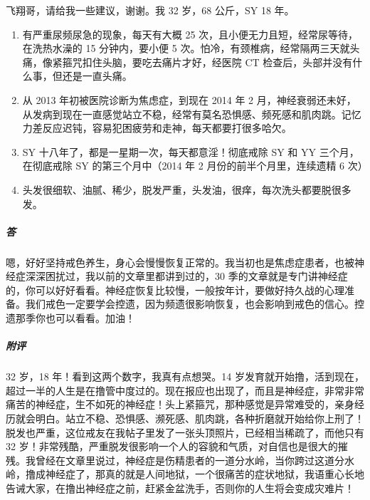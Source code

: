 \begin{case}
    飞翔哥，请给我一些建议，谢谢。我 32 岁，68 公斤，SY 18 年。\begin{enumerate}
        \item 有严重尿频尿急的现象，每天有大概 25 次，且小便无力且短，经常尿等待，在洗热水澡的 15 分钟内，要小便 5 次。怕冷，有颈椎病，经常隔两三天就头痛，像紧箍咒扣住头脑，要吃去痛片才好，经医院 CT 检查后，头部并没有什么事，但还是一直头痛。
        \item 从 2013 年初被医院诊断为焦虑症，到现在 2014 年 2 月，神经衰弱还未好，从发病到现在一直感觉站立不稳，经常有莫名恐惧感、频死感和肌肉跳。记忆力差反应迟钝，容易犯困疲劳和走神，每天都要打很多哈欠。
        \item SY 十八年了，都是一星期一次，每天都意淫！彻底戒除 SY 和 YY 三个月，在彻底戒除 SY 的第三个月中（2014 年 2 月份的前半个月里，连续遗精 6 次）
        \item 头发很细软、油腻、稀少，脱发严重，头发油，很痒，每次洗头都要脱很多发。
    \end{enumerate}
    \subparagraph{答} 嗯，好好坚持戒色养生，身心会慢慢恢复正常的。我当初也是焦虑症患者，也被神经症深深困扰过，我以前的文章里都讲到过的，30 季的文章就是专门讲神经症的，你可以好好看看。神经症恢复比较慢，一般按年计，要做好持久战的心理准备。我们戒色一定要学会控遗，因为频遗很影响恢复，也会影响到戒色的信心。控遗那季你也可以看看。加油！
    \subparagraph{附评} 32 岁，18 年！看到这两个数字，我真有点想哭。14 岁发育就开始撸，活到现在，超过一半的人生是在撸管中度过的。现在报应也出现了，而且是神经症，非常非常痛苦的神经症，生不如死的神经症！头上紧箍咒，那种感觉是异常难受的，亲身经历就会明白。站立不稳、恐惧感、濒死感、肌肉跳，各种折磨就开始给你上刑了！脱发也严重，这位戒友在我帖子里发了一张头顶照片，已经相当稀疏了，而他只有 32 岁！非常残酷，严重脱发很影响一个人的容貌和气质，对自信也是很大的摧残。我曾经在文章里说过，神经症是伤精患者的一道分水岭，当你跨过这道分水岭，撸成神经症了，那真的就是人间地狱，一个很痛苦的症状地狱，我语重心长地告诫大家，在撸出神经症之前，赶紧金盆洗手，否则你的人生将会变成灾难片！
\end{case}

